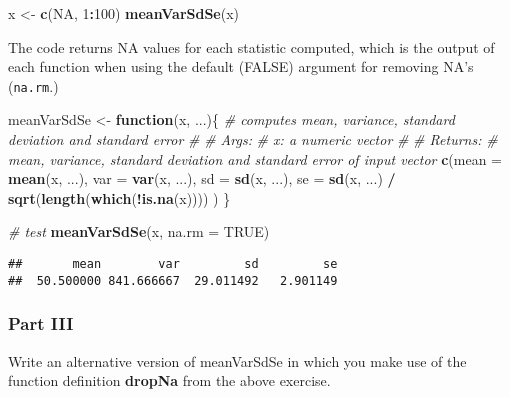 \documentclass[12,]{article}
\newenvironment{Shaded}{\begin{snugshade}}{\end{snugshade}}
\newcommand{\KeywordTok}[1]{\textcolor[rgb]{0.13,0.29,0.53}{\textbf{#1}}}
\newcommand{\DataTypeTok}[1]{\textcolor[rgb]{0.13,0.29,0.53}{#1}}
\newcommand{\DecValTok}[1]{\textcolor[rgb]{0.00,0.00,0.81}{#1}}
\newcommand{\StringTok}[1]{\textcolor[rgb]{0.31,0.60,0.02}{#1}}
\newcommand{\CommentTok}[1]{\textcolor[rgb]{0.56,0.35,0.01}{\textit{#1}}}
\newcommand{\OtherTok}[1]{\textcolor[rgb]{0.56,0.35,0.01}{#1}}
\newcommand{\ControlFlowTok}[1]{\textcolor[rgb]{0.13,0.29,0.53}{\textbf{#1}}}
\newcommand{\OperatorTok}[1]{\textcolor[rgb]{0.81,0.36,0.00}{\textbf{#1}}}
\newcommand{\NormalTok}[1]{#1}
\begin{document}
\begin{Shaded}
\begin{Highlighting}[]
\NormalTok{x <-}\StringTok{ }\KeywordTok{c}\NormalTok{(}\OtherTok{NA}\NormalTok{, }\DecValTok{1}\OperatorTok{:}\DecValTok{100}\NormalTok{)}
\KeywordTok{meanVarSdSe}\NormalTok{(x)}
\end{Highlighting}
\end{Shaded}

The code returns NA values for each statistic computed, which is the
output of each function when using the default (FALSE) argument for
removing NA's (\texttt{na.rm}.)

\begin{Shaded}
\begin{Highlighting}[]
\NormalTok{meanVarSdSe <-}\StringTok{ }\ControlFlowTok{function}\NormalTok{(x, ...)\{}
  \CommentTok{# computes mean, variance, standard deviation and standard error}
  \CommentTok{#}
  \CommentTok{# Args:}
  \CommentTok{#   x: a numeric vector}
  \CommentTok{#}
  \CommentTok{# Returns:}
  \CommentTok{#   mean, variance, standard deviation and standard error of input vector}
  \KeywordTok{c}\NormalTok{(}\DataTypeTok{mean =} \KeywordTok{mean}\NormalTok{(x, ...),}
    \DataTypeTok{var =} \KeywordTok{var}\NormalTok{(x, ...),}
    \DataTypeTok{sd =} \KeywordTok{sd}\NormalTok{(x, ...),}
    \DataTypeTok{se =} \KeywordTok{sd}\NormalTok{(x, ...) }\OperatorTok{/}\StringTok{ }\KeywordTok{sqrt}\NormalTok{(}\KeywordTok{length}\NormalTok{(}\KeywordTok{which}\NormalTok{(}\OperatorTok{!}\KeywordTok{is.na}\NormalTok{(x))))}
\NormalTok{  )}
\NormalTok{\}}

\CommentTok{# test}
\KeywordTok{meanVarSdSe}\NormalTok{(x, }\DataTypeTok{na.rm =} \OtherTok{TRUE}\NormalTok{)}
\end{Highlighting}
\end{Shaded}

\begin{verbatim}
##       mean        var         sd         se
##  50.500000 841.666667  29.011492   2.901149
\end{verbatim}

\subsubsection*{Part III}\label{part-iii}

Write an alternative version of meanVarSdSe in which you make use of the
function definition \textbf{dropNa} from the above exercise.
\end{document}
